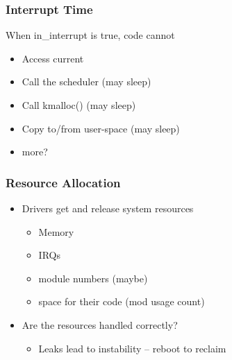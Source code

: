 % 
\begin{frame}[fragile]
    \frametitle{Interrupt Time}
When in\_interrupt is true, code cannot \pause
    \begin{itemize}
        \item Access current
        \item Call the scheduler (may sleep)
        \item Call kmalloc() (may sleep)
        \item Copy to/from user-space (may sleep)
        \item more?
    \end{itemize}
\end{frame}
% 
% 
\begin{frame}[fragile]
    \frametitle{Resource Allocation}
    \begin{itemize}
        \item Drivers get and release system resources
        \begin{itemize}
            \item Memory
            \item IRQs
            \item module numbers (maybe)
            \item space for their code (mod usage count)
        \end{itemize} \pause
        \item Are the resources handled correctly?
        \begin{itemize}
            \item Leaks lead to instability -- reboot to reclaim
        \end{itemize}
    \end{itemize}
\end{frame}
% 

